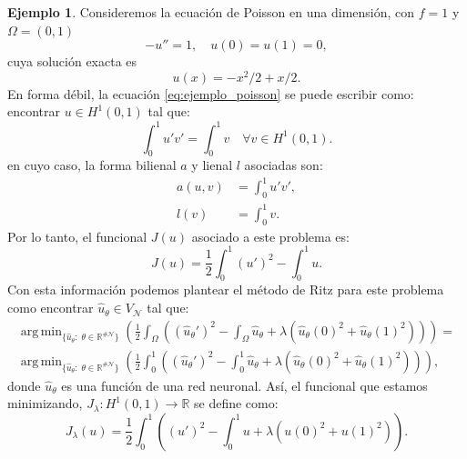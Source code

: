 \documentclass[a4paper,11pt,spanish, twoside, leqno]{tfg-uam}
\DeclareMathOperator*{\argmin}{arg\,min}
\theoremstyle{definition}
\newtheorem{exmp}[teor]{Ejemplo}
\begin{document}
\begin{mdframed}  
    \begin{exmp}
        Consideremos la ecuación de Poisson en una dimensión, con $f = 1$ y $\Omega=(0,1)$
        \begin{equation}\label{eq:ejemplo_poisson}
        -u'' = 1, \quad u(0) = u(1) = 0,
        \end{equation} 
        cuya solución exacta es 
        \begin{equation*}
        u(x) = -x^2/2 + x/2.
        \end{equation*}
        En forma débil, la ecuación \eqref{eq:ejemplo_poisson} se puede escribir como: encontrar $ u \in H^1(0,1) $ tal que:
        \begin{equation*}
            \int_0^1 u'v' = \int_0^1 v \quad \forall v \in H^1(0,1).
        \end{equation*}
        en cuyo caso, la forma bilienal $a$ y lienal $l$ asociadas son:
        \begin{align*}
            a(u,v) &= \int_0^1 u'v', \\
            l(v) &= \int_0^1 v.
        \end{align*}
        Por lo tanto, el funcional $ J(u) $ asociado a este problema es:
        \begin{equation*}
            J(u) = \frac{1}{2} \int_0^1 (u')^2 - \int_0^1 u.
        \end{equation*}
        Con esta información podemos plantear el método de Ritz para este problema como encontrar $ \hat{u}_\theta \in V_{\mathcal{N}} $ tal que: 
        \begin{align*}
        \argmin_{\{\hat{u}_\theta:\; \theta \in \mathbb{R}^{\#\mathcal{N}} \}} \left( \frac{1}{2} \int_\Omega \left((\hat{u}_\theta')^2 - \int_\Omega \hat{u}_\theta + \lambda (\hat{u}_\theta(0)^2 + \hat{u}_\theta(1)^2)\right)\right) =\\
        \argmin_{\{\hat{u}_\theta:\; \theta \in \mathbb{R}^{\#\mathcal{N}} \}} \left(\frac{1}{2} \int_0^1 \left((\hat{u}_\theta')^2 - \int_0^1 \hat{u}_\theta + \lambda (\hat{u}_\theta(0)^2 + \hat{u}_\theta(1)^2)\right)\right),
        \end{align*}
        donde $\hat{u}_\theta$ es una función de una red neuronal. Así, el funcional que estamos minimizando, $J_\lambda: H^1(0,1) \to \mathbb{R}$ se define como:
        \begin{equation*}
        J_\lambda(u) = \frac{1}{2} \int_0^1 \left((u')^2 - \int_0^1 u + \lambda (u(0)^2 + u(1)^2)\right).

\end{equation*}
\end{exmp}
\end{mdframed}
\end{document}
